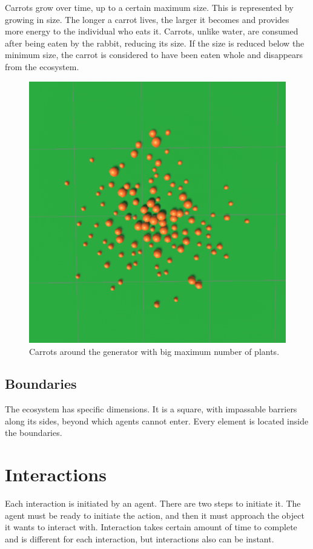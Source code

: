 Carrots grow over time, up to a certain maximum size. This is represented by growing in size. The longer a carrot lives, the larger it becomes and provides more energy to the individual who eats it. Carrots, unlike water, are consumed after being eaten by the rabbit, reducing its size. If the size is reduced below the minimum size, the carrot is considered to have been eaten whole and disappears from the ecosystem.

\begin{figure}
    \centering
    \includegraphics[width=\textwidth]{Images/carrot_generator_v2.png}
    \caption{Carrots around the generator with big maximum number of plants.}
    \label{fig:carrotGenerator}
\end{figure}

\subsection{Boundaries}
The ecosystem has specific dimensions. It is a square, with impassable barriers along its sides, beyond which agents cannot enter. Every element is located inside the boundaries.

\section{Interactions}
\label{interactionDescription}
Each interaction is initiated by an agent. There are two steps to initiate it. The agent must be ready to initiate the action, and then it must approach the object it wants to interact with. Interaction takes certain amount of time to complete and is different for each interaction, but interactions also can be instant. 


